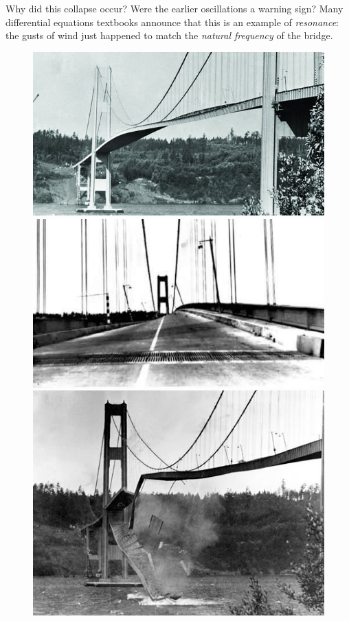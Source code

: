 \documentclass[12pt]{amsart}
\numberwithin{equation}{section}
\theoremstyle{plain} %
\theoremstyle{definition}
\theoremstyle{remark}
\begin{document}
Why did this collapse occur? Were the earlier oscillations a warning
sign? Many differential equations textbooks announce that this is an
example of {\it resonance}: the gusts of wind just happened to match the
{\it natural frequency} of the bridge.
\begin{figure}[!htb]
  \includegraphics[width=\linewidth]{tac01}
\endminipage\hfill
{}
  \includegraphics[width=\linewidth]{tac02}
\endminipage\hfill
{}%
  \includegraphics[width=\linewidth]{tac03}
\endminipage
\end{figure}
\end{document}
